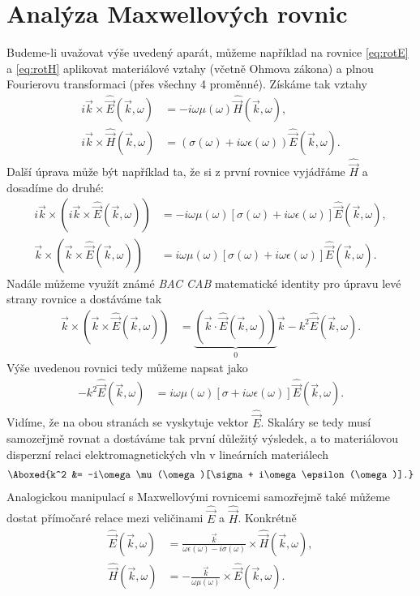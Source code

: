 \documentclass[11pt,a4paper]{article}
\begin{document}
    \section{Analýza Maxwellových rovnic}

        Budeme-li uvažovat výše uvedený aparát, můžeme například na rovnice \ref{eq:rotE} a \ref{eq:rotH} aplikovat materiálové vztahy (včetně Ohmova zákona) a plnou Fourierovu transformaci (přes všechny 4 proměnné). Získáme tak vztahy
        \begin{align*}
            i\vec k \times \hat{\vec E}(\vec k, \omega) &= -i\omega \mu(\omega) \hat{\vec H}(\vec k, \omega),
        \\
            i\vec k \times \hat{\vec H}(\vec k, \omega) &= (\sigma(\omega) + i\omega \epsilon(\omega)) \hat{\vec E}(\vec k, \omega).
        \end{align*}
        Další úprava může být například ta, že si z první rovnice vyjádřáme $\hat{\vec H}$ a dosadíme do druhé:
        \begin{align*}
            i\vec k \times (i\vec k \times \hat{\vec E}(\vec k, \omega)) &= -i\omega\mu(\omega)[\sigma(\omega) + i\omega\epsilon(\omega)] \hat{\vec E}(\vec k, \omega),
        \\
            \vec k \times (\vec k \times \hat{\vec E}(\vec k, \omega)) &= i\omega\mu(\omega)[\sigma(\omega) + i\omega\epsilon(\omega)] \hat{\vec E}(\vec k, \omega).
        \end{align*}
        Nadále můžeme využít známé \emph{BAC CAB} matematické identity pro úpravu levé strany rovnice a dostáváme tak
        \begin{align*}
            \vec k \times (\vec k \times \hat{\vec E}(\vec k, \omega)) &= \underbrace{(\vec k \cdot \hat{\vec E}(\vec k, \omega))}_0 \vec k - k^2 \hat{\vec E}(\vec k, \omega).
        \end{align*}
        Výše uvedenou rovnici tedy můžeme napsat jako
        \begin{align*}
            -k^2 \hat{\vec E}(\vec k, \omega) &= i\omega\mu(\omega)[\sigma + i\omega\epsilon(\omega)] \hat{\vec E}(\vec k, \omega).
        \end{align*}
        Vidíme, že na obou stranách se vyskytuje vektor $\hat{\vec E}$. Skaláry se tedy musí samozeřjmě rovnat a dostáváme tak první důležitý výsledek, a to materiálovou disperzní relaci elektromagnetických vln v lineárních materiálech
        \begin{align}
            \label{eq:disperze}
            \Aboxed{k^2 &= -i\omega\mu(\omega)[\sigma + i\omega\epsilon(\omega)].}
        \end{align}
        Analogickou manipulací s Maxwellovými rovnicemi samozřejmě také můžeme dostat přímočaré relace mezi veličinami $\hat{\vec E}$ a $\hat{\vec H}$. Konkrétně
        \begin{align}
            \hat{\vec E}(\vec k, \omega) &= \frac{\vec k}{\omega \epsilon(\omega) - i\sigma(\omega)} \times \hat{\vec H}(\vec k, \omega),
        \\
            \hat{\vec H}(\vec k, \omega) &= -\frac{\vec k}{\omega \mu(\omega)} \times \hat{\vec E}(\vec k, \omega).
        \end{align}
\end{document}
